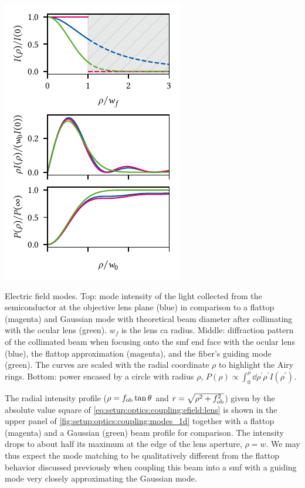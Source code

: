 \begin{marginfigure}[*-7]
    \centering
    \includegraphics{img/pdf/setup/modes_1d}
    \caption[]{
        Electric field modes.
        Top: mode intensity of the light collected from the semiconductor at the objective lens plane (blue) in comparison to a flattop (magenta) and Gaussian  mode with theoretical beam diameter after collimating with the ocular lens (green).
        $w_f$ is the lens \gls{ca} radius.
        Middle: diffraction pattern of the collimated beam when focusing onto the \gls{smf} end face with the ocular lens (blue), the flattop approximation (magenta), and the fiber's guiding mode (green).
        The curves are scaled with the radial coordinate $\rho$ to highlight the Airy rings.
        Bottom: power encased by a circle with radius $\rho$, $P(\rho)\propto\int_0^{\rho}\dd{\rho^\prime} \rho^{\prime} I(\rho^{\prime})$.
    }
    \label{fig:setup:optics:coupling:modes_1d}
\end{marginfigure}

The radial intensity profile ($\rho = f_{\mathrm{ob}}\tan\theta$ and $r=\sqrt{\rho^2 + f_{\mathrm{ob}}^2}$) given by the absolute value square of \cref{eq:setup:optics:coupling:efield:lens} is shown in the upper panel of \cref{fig:setup:optics:coupling:modes_1d} together with a flattop (magenta) and a Gaussian (green) beam profile for comparison.
The intensity drops to about half its maximum at the edge of the lens aperture, $\rho=w$.
We may thus expect the mode matching to be qualitatively different from the flattop behavior discussed previously when coupling this beam into a \gls{smf} with a guiding mode very closely approximating the Gaussian  mode.

